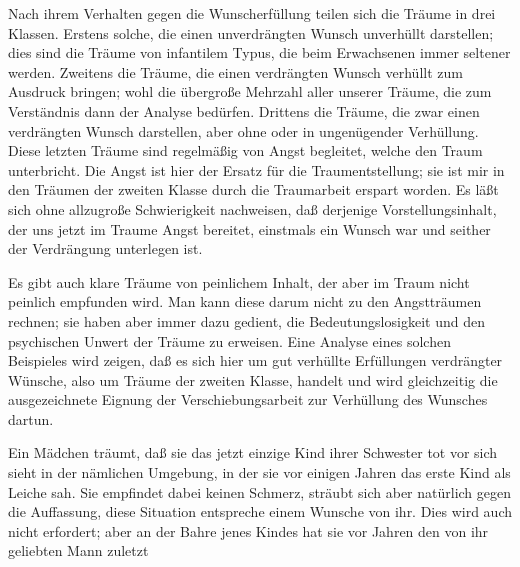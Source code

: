 \documentclass[twoside=true,titlepage=false,open=any, parskip=never, fontsize=10pt, headings=small, chapterprefix=false, appendixprefix=false]{scrbook}
\begin{document}
         
            
            
            
        \pstart
        Nach ihrem Verhalten gegen die Wunscherfüllung teilen sich die Träume in drei
               Klassen. Erstens solche, die einen unverdrängten Wunsch unverhüllt darstellen; dies sind die Träume von
               infantilem Typus, die beim Erwachsenen immer seltener werden. Zweitens die
               Träume, die einen verdrängten Wunsch verhüllt zum Ausdruck bringen; wohl die übergroße
               Mehrzahl aller unserer Träume, die zum Verständnis dann der Analyse bedürfen.
               Drittens die Träume, die zwar einen verdrängten Wunsch darstellen, aber ohne oder in ungenügender Verhüllung.
               Diese letzten Träume sind regelmäßig von
               Angst begleitet, welche den Traum unterbricht. Die
               Angst ist hier der Ersatz für die Traumentstellung; sie ist mir in den
               Träumen der zweiten Klasse durch die Traumarbeit erspart worden. Es läßt sich
               ohne allzugroße Schwierigkeit nachweisen, daß derjenige Vorstellungsinhalt, der
               uns jetzt im Traume Angst bereitet, einstmals ein Wunsch war und seither der
               Verdrängung unterlegen ist.
        \pend
    
            
        \pstart
        Es gibt auch klare Träume von peinlichem Inhalt, der aber im Traum nicht
               peinlich empfunden wird. Man kann diese darum nicht zu den Angstträumen rechnen;
               sie haben aber immer dazu gedient, die Bedeutungslosigkeit und den psychischen
               Unwert der Träume zu erweisen. Eine Analyse eines solchen Beispieles wird
               zeigen, daß es sich hier um gut verhüllte Erfüllungen
                  verdrängter Wünsche, also um Träume der zweiten Klasse,
               handelt und wird gleichzeitig die ausgezeichnete Eignung der Verschiebungsarbeit zur Verhüllung des Wunsches dartun.
        \pend
    
            
        \pstart
        Ein Mädchen träumt, daß sie das jetzt einzige Kind ihrer Schwester tot vor sich
               sieht in der nämlichen Umgebung, in der sie vor einigen Jahren das erste Kind
               als Leiche sah. Sie empfindet dabei keinen Schmerz, sträubt sich aber
               natürlich gegen die Auffassung, diese Situation entspreche einem Wunsche
               von ihr. Dies wird auch nicht erfordert; aber an der Bahre jenes Kindes hat
               sie vor Jahren den von ihr geliebten Mann zuletzt
        \pend
    
\end{document}

